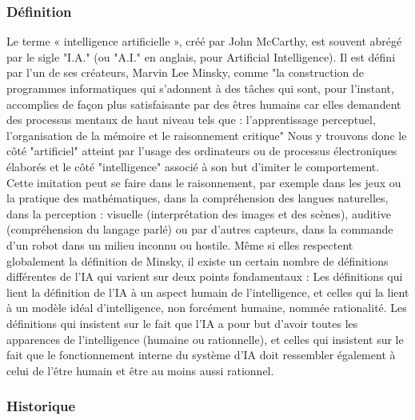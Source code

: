 \documentclass[a4paper,12pt]{article} %
\begin{document}
\subsubsection{Définition}
Le terme « intelligence artificielle », créé par John McCarthy, est souvent abrégé par le sigle "I.A." (ou "A.I." en anglais, pour Artificial Intelligence). 
\newline
Il est défini par l’un de ses créateurs, Marvin Lee Minsky, comme "la construction de programmes informatiques qui s’adonnent à des tâches qui sont, pour l’instant, accomplies de façon plus satisfaisante par des êtres humains car elles demandent des processus mentaux de haut niveau tels que : l’apprentissage perceptuel, l’organisation de la mémoire et le raisonnement critique" Nous y trouvons donc le côté "artificiel" atteint par l'usage des ordinateurs ou de processus électroniques élaborés et le côté "intelligence" associé à son but d'imiter le comportement. 
\newline
Cette imitation peut se faire dans le raisonnement, par exemple dans les jeux ou la pratique des mathématiques, dans la compréhension des langues naturelles, dans la perception : visuelle (interprétation des images et des scènes), auditive (compréhension du langage parlé) ou par d'autres capteurs, dans la commande d'un robot dans un milieu inconnu ou hostile.
Même si elles respectent globalement la définition de Minsky, il existe un certain nombre de définitions différentes de l'IA qui varient sur deux points fondamentaux :
\newline
Les définitions qui lient la définition de l'IA à un aspect humain de l'intelligence, et celles qui la lient à un modèle idéal d'intelligence, non forcément humaine, nommée rationalité.
\newline
Les définitions qui insistent sur le fait que l'IA a pour but d'avoir toutes les apparences de l'intelligence (humaine ou rationnelle), et celles qui insistent sur le fait que le fonctionnement interne du système d'IA doit ressembler également à celui de l'être humain et être au moins aussi rationnel. 
\subsubsection{Historique}
\end{document}

